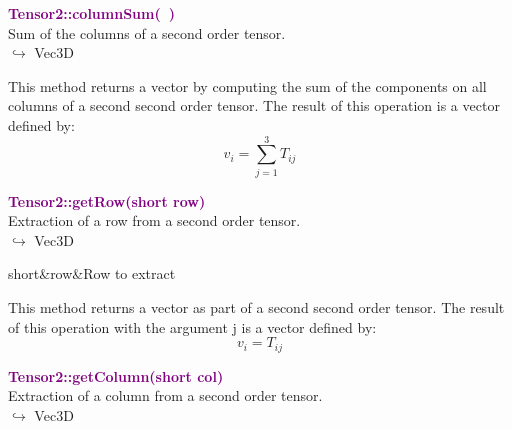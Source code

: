 \textcolor{purple}{\textbf{Tensor2::columnSum(~)}}\label{Tensor2::columnSum()}\\
Sum of the columns of a second order tensor.\\ \hspace*{10mm}$\hookrightarrow$ Vec3D

This method returns a vector by computing the sum of the components on all columns of a second second order tensor.
The result of this operation is a vector defined by:
\begin{equation*}
v_{i}=\sum_{j=1}^{3}T_{ij}
\end{equation*}

\textcolor{purple}{\textbf{Tensor2::getRow(short row)}}\label{Tensor2::getRow(short row)}\\
Extraction of a row from a second order tensor.\\ \hspace*{10mm}$\hookrightarrow$ Vec3D

\begin{tcolorbox}[width=\textwidth,myArgs,tabularx={ll|R}]
short&row&Row to extract
\end{tcolorbox}

This method returns a vector as part of a second second order tensor.
The result of this operation with the argument j is a vector defined by:
\begin{equation*}
v_{i} = T_{ij}
\end{equation*}

\textcolor{purple}{\textbf{Tensor2::getColumn(short col)}}\label{Tensor2::getColumn(short col)}\\
Extraction of a column from a second order tensor.\\ \hspace*{10mm}$\hookrightarrow$ Vec3D

